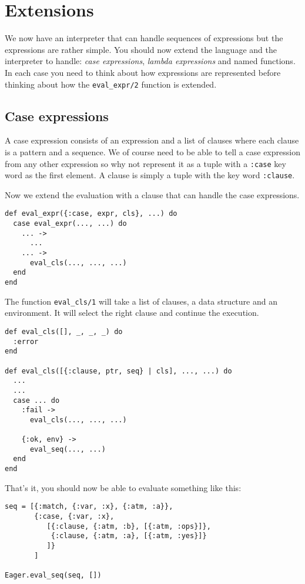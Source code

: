 \documentclass[a4paper,11pt]{article}
\begin{document}
\section{Extensions}

We now have an interpreter that can handle sequences of expressions
but the expressions are rather simple. You should now extend the
language and the interpreter to handle: {\em case expressions}, {\em
  lambda expressions} and named functions. In each case you need to
think about how expressions are represented before thinking about how
the {\tt eval_expr/2} function is extended.

\subsection{Case expressions}
A case expression consists of an expression and a list of clauses
where each clause is a pattern and a sequence. We of course need to be
able to tell a case expression from any other expression so why not
represent it as a tuple with a {\tt :case} key word as the first
element. A clause is simply a tuple with the key word {\tt :clause}.

Now we extend the evaluation with a clause that can handle the case
expressions.

\begin{verbatim}
def eval_expr({:case, expr, cls}, ...) do
  case eval_expr(..., ...) do
    ... ->
      ...
    ... ->
      eval_cls(..., ..., ...)
  end
end
\end{verbatim}

The function {\tt eval_cls/1} will take a list of
clauses, a data structure and an environment. It will select the right
clause and continue the execution.

\begin{verbatim}
def eval_cls([], _, _, _) do
  :error
end

def eval_cls([{:clause, ptr, seq} | cls], ..., ...) do
  ...
  ...
  case ... do
    :fail ->
      eval_cls(..., ..., ...)

    {:ok, env} ->
      eval_seq(..., ...)
  end
end
\end{verbatim}

That's it, you should now be able to evaluate something like this:

\begin{verbatim}
seq = [{:match, {:var, :x}, {:atm, :a}},
       {:case, {:var, :x},
          [{:clause, {:atm, :b}, [{:atm, :ops}]},
           {:clause, {:atm, :a}, [{:atm, :yes}]}
          ]}
       ]

Eager.eval_seq(seq, [])
\end{verbatim}
\end{document}
